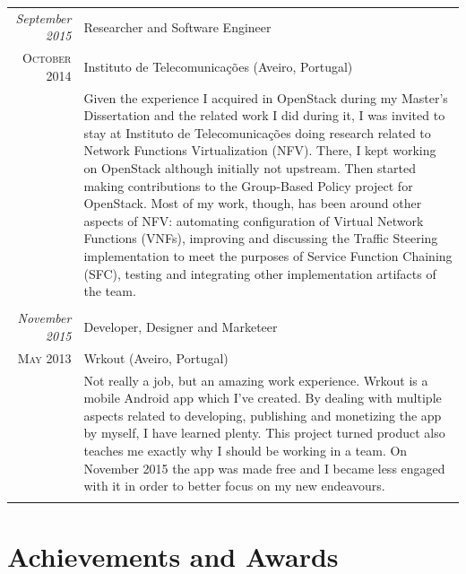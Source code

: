 \documentclass[letter,10pt]{article} %
\begin{document}
\begin{tabular}{r|p{13.4cm}}
	\emph{September 2015} & Researcher and Software Engineer \\
    \textsc{October 2014} & Instituto de Telecomunicações (Aveiro, Portugal) \\
    & \footnotesize{Given the experience I acquired in OpenStack during my Master's Dissertation and the related work I did during it, I was invited to stay at Instituto de Telecomunicações doing research related to Network Functions Virtualization (NFV). There, I kept working on OpenStack although initially not upstream. Then started making contributions to the Group-Based Policy project for OpenStack. Most of my work, though, has been around other aspects of NFV: automating configuration of Virtual Network Functions (VNFs), improving and discussing the Traffic Steering implementation to meet the purposes of Service Function Chaining (SFC), testing and integrating other implementation artifacts of the team. }\\
	\multicolumn{2}{c}{} \\

	\emph{November 2015} & Developer, Designer and Marketeer \\
	\textsc{May 2013} & Wrkout (Aveiro, Portugal) \\
	& \footnotesize{Not really a job, but an amazing work experience. Wrkout is a mobile Android app which I've created. By dealing with multiple aspects related to developing, publishing and monetizing the app by myself, I have learned plenty. This project turned product also teaches me exactly why I should be working in a team. On November 2015 the app was made free and I became less engaged with it in order to better focus on my new endeavours.}\\
	\multicolumn{2}{c}{}\\

\end{tabular}


\section{Achievements and Awards}
\end{document}
